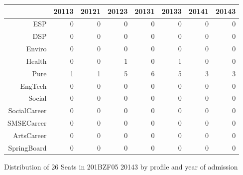 \documentclass{article}\usepackage[]{graphicx}\usepackage[]{color}
\begin{document}
\begin{figure}[H]
\centering
\begin{tabular}{rrrrrrrr}
  \hline
 & 20113 & 20121 & 20123 & 20131 & 20133 & 20141 & 20143 \\ 
  \hline
ESP &   0 &   0 &   0 &   0 &   0 &   0 &   0 \\ 
  DSP &   0 &   0 &   0 &   0 &   0 &   0 &   0 \\ 
  Enviro &   0 &   0 &   0 &   0 &   0 &   0 &   0 \\ 
  Health &   0 &   0 &   1 &   0 &   1 &   0 &   0 \\ 
  Pure &   1 &   1 &   5 &   6 &   5 &   3 &   3 \\ 
  EngTech &   0 &   0 &   0 &   0 &   0 &   0 &   0 \\ 
  Social &   0 &   0 &   0 &   0 &   0 &   0 &   0 \\ 
  SocialCareer &   0 &   0 &   0 &   0 &   0 &   0 &   0 \\ 
  SMSECareer &   0 &   0 &   0 &   0 &   0 &   0 &   0 \\ 
  ArtsCareer &   0 &   0 &   0 &   0 &   0 &   0 &   0 \\ 
  SpringBoard &   0 &   0 &   0 &   0 &   0 &   0 &   0 \\ 
   \hline
\end{tabular}
\caption{Distribution of 26 Seats in 201BZF05 20143 by profile and year of admission} 
\end{figure}
\end{document}
